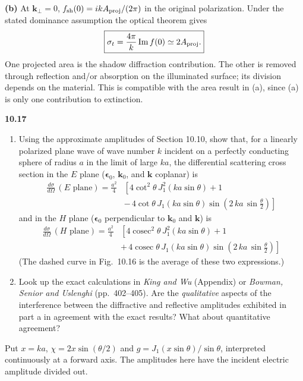 \textbf{(b)} At $\mathbf k_\perp=0$,
$f_{\rm sh}(0)=ikA_{\rm proj}/(2\pi)$ in the original polarization.
Under the stated dominance assumption the optical theorem gives
\[
\boxed{\sigma_t=\frac{4\pi}{k}\operatorname{Im} f(0)
\simeq2A_{\rm proj}.}
\]
One projected area is the shadow diffraction contribution. The other
is removed through reflection and/or absorption on the illuminated
surface; its division depends on the material. This is compatible with
the area result in (a), since (a) is only one contribution to extinction.

\par\bigskip
\noindent\textbf{10.17}\quad\begin{enumerate}
\item[(a)] Using the approximate amplitudes of Section 10.10, show that, for a linearly polarized plane wave of wave number $k$ incident on a perfectly conducting sphere of radius $a$ in the limit of large $ka$, the differential scattering cross section in the $E$ plane ($\boldsymbol{\epsilon}_{0}$, $\mathbf{k}_{0}$, and $\mathbf{k}$ coplanar) is
\begin{align*}
\frac{d\sigma}{d\Omega}\,(E\text{ plane})=\frac{a^{2}}{4}&\left[4\cot^{2}\theta\,J_{1}^{2}(ka\sin\theta)+1\right.\\
&\left.-\,4\cot\theta\,J_{1}(ka\sin\theta)\sin\!\left(2\,ka\,\sin\frac{\theta}{2}\right)\right]
\end{align*}
and in the $H$ plane ($\boldsymbol{\epsilon}_{0}$ perpendicular to $\mathbf{k}_{0}$ and $\mathbf{k}$) is
\begin{align*}
\frac{d\sigma}{d\Omega}\,(H\text{ plane})=\frac{a^{2}}{4}&\left[4\operatorname{cosec}^{2}\theta\,J_{1}^{2}(ka\sin\theta)+1\right.\\
&\left.+\,4\operatorname{cosec}\theta\,J_{1}(ka\sin\theta)\sin\!\left(2\,ka\,\sin\frac{\theta}{2}\right)\right]
\end{align*}
(The dashed curve in Fig.~10.16 is the average of these two expressions.)
\item[(b)] Look up the exact calculations in \emph{King and Wu} (Appendix) or \emph{Bowman, Senior and Uslenghi} (pp.~402--405). Are the \emph{qualitative} aspects of the interference between the diffractive and reflective amplitudes exhibited in part a in agreement with the exact results? What about quantitative agreement?
\end{enumerate}
\solution
Put $x=ka$, $\chi=2x\sin(\theta/2)$ and
$g=J_1(x\sin\theta)/\sin\theta$, interpreted continuously at a forward
axis. The amplitudes here have the incident electric amplitude divided
out.

